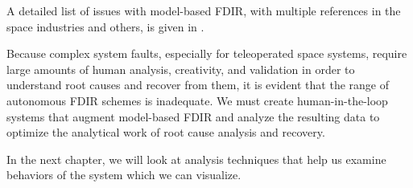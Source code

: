 A detailed list of issues with model-based FDIR, with multiple references in the space industries and others, is given in \cite{kurien2010intrinsic}.

Because complex system faults, especially for teleoperated space systems, require large amounts of human analysis, creativity, and validation in order to understand root causes and recover from them, it is evident that the range of autonomous FDIR schemes is inadequate. We must create human-in-the-loop systems that augment model-based FDIR and analyze the resulting data to optimize the analytical work of root cause analysis and recovery.

In the next chapter, we will look at analysis techniques that help us examine behaviors of the system which we can visualize.